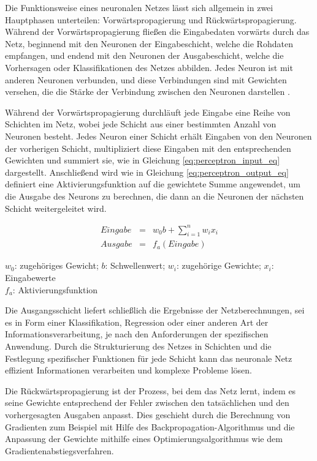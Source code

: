 Die Funktionsweise eines neuronalen Netzes lässt sich allgemein in zwei Hauptphasen unterteilen: Vorwärtspropagierung und Rückwärtspropagierung. Während der Vorwärtspropagierung fließen die Eingabedaten vorwärts durch das Netz, beginnend mit den Neuronen der Eingabeschicht, welche die Rohdaten empfangen, und endend mit den Neuronen der Ausgabeschicht, welche die Vorhersagen oder Klassifikationen des Netzes abbilden. Jedes Neuron ist mit anderen Neuronen verbunden, und diese Verbindungen sind mit Gewichten versehen, die die Stärke der Verbindung zwischen den Neuronen darstellen  \citep{Manuela_Kunstliche_Intelligenz}.

Während der Vorwärtspropagierung durchläuft jede Eingabe eine Reihe von Schichten im Netz, wobei jede Schicht aus einer bestimmten Anzahl von Neuronen besteht. Jedes Neuron einer Schicht erhält Eingaben von den Neuronen der vorherigen Schicht, multipliziert diese Eingaben mit den entsprechenden Gewichten und summiert sie, wie in Gleichung \ref{eq:perceptron_input_eq} dargestellt. Anschließend wird wie in Gleichung \ref{eq:perceptron_output_eq} definiert eine Aktivierungsfunktion auf die gewichtete Summe angewendet, um die Ausgabe des Neurons zu berechnen, die dann an die Neuronen der nächsten Schicht weitergeleitet wird.

\begin{eqnarray}
    Eingabe&=&w_0b+\sum_{i=1}^{n}w_ix_i \label{eq:perceptron_input_eq} \\
    Ausgabe&=&f_a(Eingabe) \label{eq:perceptron_output_eq}
\end{eqnarray}

\begin{center}
    \begin{footnotesize}
        $w_0$: zugehöriges Gewicht; $b$: Schwellenwert; $w_i$: zugehörige Gewichte; $x_i$: Eingabewerte\\
        $f_a$: Aktivierungsfunktion
    \end{footnotesize}
\end{center}

Die Ausgangsschicht liefert schließlich die Ergebnisse der Netzberechnungen, sei es in Form einer Klassifikation, Regression oder einer anderen Art der Informationsverarbeitung, je nach den Anforderungen der spezifischen Anwendung. Durch die Strukturierung des Netzes in Schichten und die Festlegung spezifischer Funktionen für jede Schicht kann das neuronale Netz effizient Informationen verarbeiten und komplexe Probleme lösen.

Die Rückwärtspropagierung ist der Prozess, bei dem das Netz lernt, indem es seine Gewichte entsprechend der Fehler zwischen den tatsächlichen und den vorhergesagten Ausgaben anpasst. Dies geschieht durch die Berechnung von Gradienten zum Beispiel mit Hilfe des Backpropagation-Algorithmus \citep{thesis_Artur_Brening} und die Anpassung der Gewichte mithilfe eines Optimierungsalgorithmus wie dem Gradientenabstiegsverfahren.

